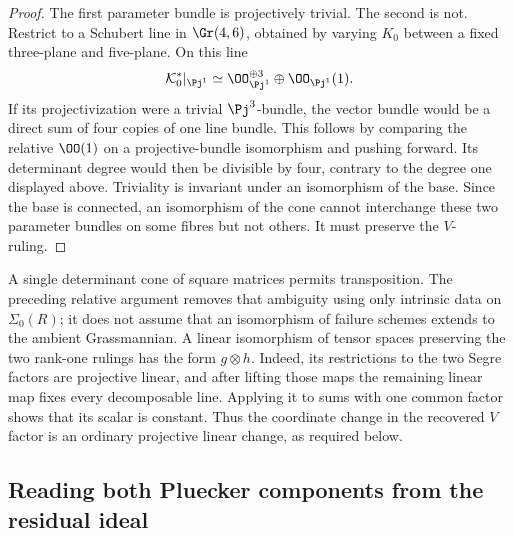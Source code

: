 \begin{proof}
The first parameter bundle is projectively trivial.  The second is
not.  Restrict to a Schubert line in \(\Gr(4,6)\), obtained by
varying \(K_0\) between a fixed three-plane and five-plane.  On
this line
\[
 \mathcal K_0^*|_{\Pj^1}\simeq
 \OO_{\Pj^1}^{\oplus3}\oplus\OO_{\Pj^1}(1).
\]
If its projectivization were a trivial \(\Pj^3\)-bundle, the
vector bundle would be a direct sum of four copies of one line
bundle.  This follows by comparing the relative \(\OO(1)\)
on a projective-bundle isomorphism and pushing forward.  Its
determinant degree would then be divisible by four, contrary to the
degree one displayed above.  Triviality is invariant under an
isomorphism of the base.  Since the base is connected, an isomorphism
of the cone cannot interchange these two parameter bundles on some
fibres but not others.  It must preserve the \(V\)-ruling.
\end{proof}

\begin{remark}
A single determinant cone of square matrices permits transposition.
The preceding relative argument removes that ambiguity using only
intrinsic data on \(\Sigma_0(R)\); it does not assume that an
isomorphism of failure schemes extends to the ambient Grassmannian.
A linear isomorphism of tensor spaces preserving the two rank-one
rulings has the form \(g\otimes h\).  Indeed, its restrictions
to the two Segre factors are projective linear, and after lifting
those maps the remaining linear map fixes every decomposable line.
Applying it to sums with one common factor shows that its scalar is
constant.  Thus the coordinate change in the recovered \(V\)
factor is an ordinary projective linear change, as required below.
\end{remark}





\subsection{Reading both Pluecker components from the residual ideal}

